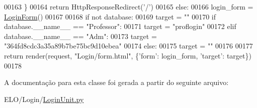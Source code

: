 \begin{DoxyCode}
00163                             \}
00164                 \textcolor{keywordflow}{return} HttpResponseRedirect(\textcolor{stringliteral}{'/'})
00165         \textcolor{keywordflow}{else}:
00166             login\_form = \hyperlink{classLogin_1_1forms_1_1LoginForm}{LoginForm}()
00167 
00168             \textcolor{keywordflow}{if} \textcolor{keywordflow}{not} database:
00169                 target = \textcolor{stringliteral}{""}
00170             \textcolor{keywordflow}{if} database.\_\_name\_\_ == \textcolor{stringliteral}{"Professor"}:
00171                 target = \textcolor{stringliteral}{"proflogin"}
00172             \textcolor{keywordflow}{elif} database.\_\_name\_\_ == \textcolor{stringliteral}{"Adm"}:
00173                 target = \textcolor{stringliteral}{"364fd8cdc3a35a89b7be75bc9d10ebea"}
00174             \textcolor{keywordflow}{else}:
00175                 target = \textcolor{stringliteral}{""}
00176 
00177             \textcolor{keywordflow}{return} render(request, \textcolor{stringliteral}{"Login/form.html"}, \{\textcolor{stringliteral}{'form'}: login\_form, \textcolor{stringliteral}{'target'}: target\})
00178 

\end{DoxyCode}


A documentação para esta classe foi gerada a partir do seguinte arquivo\-:\begin{DoxyCompactItemize}
\item 
E\-L\-O/\-Login/\hyperlink{LoginUnit_8py}{Login\-Unit.\-py}\end{DoxyCompactItemize}
